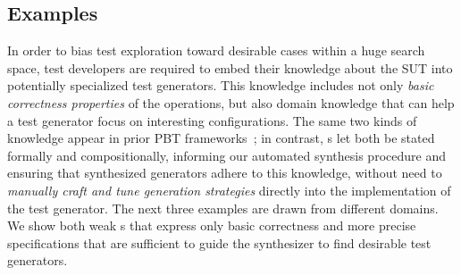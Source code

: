 \subsection{Examples}

%
  In order to bias test exploration toward desirable cases
  within a huge search space, test developers are required to embed their knowledge about the SUT into potentially specialized test generators.
  This knowledge includes not only \emph{basic correctness properties} of the operations, but also domain knowledge that can help a test
  generator focus on interesting configurations.
  The same two kinds of knowledge appear in prior PBT
  frameworks~\cite{pbt-ifc}; in contrast, \tyName{}s let both be stated
  formally and compositionally, informing our automated synthesis procedure
  and ensuring that synthesized generators adhere to this knowledge, without
  need to \emph{manually craft and tune generation strategies} directly into
  the implementation of the test generator.
  The next three examples are drawn from different domains. We show both weak \tyName{}s that express only basic correctness and more precise specifications that are sufficient to guide the synthesizer to find desirable test generators.



